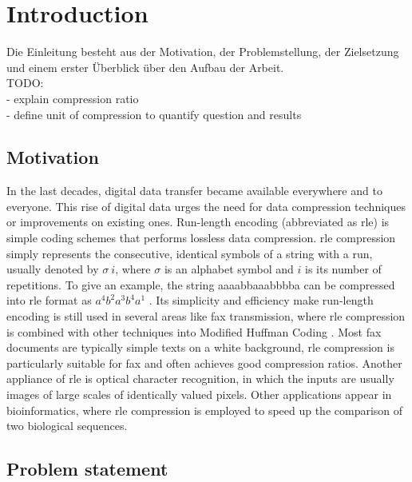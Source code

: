
\chapter{Introduction}
\label{ch:Introduction}
Die Einleitung besteht aus der Motivation, der Problemstellung, der Zielsetzung und einem erster Überblick über den Aufbau der Arbeit. \\
TODO: \\
- explain compression ratio \\
- define unit of compression to quantify question and results \\

\section{Motivation}
\label{ch:Introduction:sec:Motivation}

In the last decades, digital data transfer became available everywhere and to everyone. This rise of digital data urges the need for data compression techniques or improvements on existing ones. Run-length encoding (abbreviated as rle) is simple coding schemes that performs lossless data compression. rle compression simply represents the consecutive, identical symbols of
a string with a run, usually denoted by $\sigma \ i$, where $\sigma$ is an alphabet symbol and $i$ is its number of repetitions. To give an example, the string aaaabbaaabbbba can be compressed into rle format as  $ a^{4}b^{2}a^{3}b^{4}a^{1}$ . Its simplicity and efficiency make run-length encoding is still used in several areas like fax transmission, where rle compression is combined with other techniques into Modified Huffman Coding \cite{fax-rle}. Most fax documents are typically simple texts on a white background, rle compression is particularly suitable for fax and often achieves good compression ratios. Another appliance of rle is optical character recognition, in which the inputs are usually images of large scales of identically valued pixels. Other applications appear in bioinformatics, where rle compression is employed to speed up the comparison of two biological sequences.

\section{Problem statement}
\label{ch:Introduction:sec:Problem statement}

